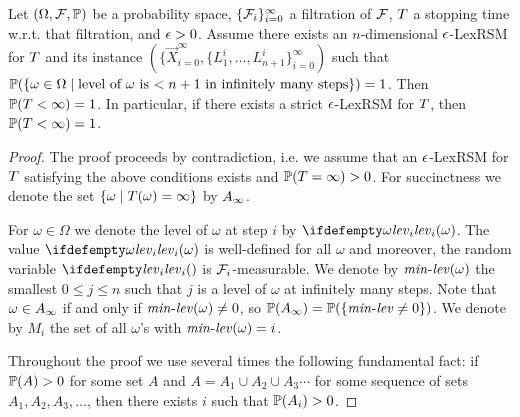 \begin{theorem}
\label{thm:lexrsm-main}
\label{THM:LEXRSM-MAIN}
Let $(\Omega,\mathcal{F},\mathbb{P})$ be a probability space, 
$\{\mathcal{F}_i\}_{i=0}^{\infty}$ a filtration of $\mathcal{F}$, $T$ a 
stopping 
time w.r.t. that filtration, and $\epsilon>0$. Assume there exists an $n$-dimensional $\epsilon$-LexRSM for $T$ and its instance $(\{\vec{X}_{i=0}^{\infty},\{L_1^i,\dots,L_{n+1}^i\}_{i=0}^{\infty})$ such that $\mathbb{P}(\{\omega\in \Omega \mid \text{level of $\omega$ is $<n+1$ in infinitely many steps}\})=1$. Then $\mathbb{P}(T<\infty)=1$. In particular, if there exists a strict $\epsilon$-LexRSM for $T$, then $\mathbb{P}(T<\infty)=1$.
\end{theorem}
\begin{proof}
The proof proceeds by contradiction, i.e. we assume that an $\epsilon$-LexRSM for 
$T$ satisfying the above conditions exists and $\mathbb{P}(T=\infty)>0$. For succinctness we denote the 
set $\{\omega\mid T(\omega)=\infty\}$ by $A_{\infty}$.

For $\omega\in \Omega$ we denote the level of $\omega$ at step $i$ by $\levelrank{\omega}{i}$.
The value $\levelrank{\omega}{i}$ is well-defined for all 
$\omega$ and moreover, the random variable $\levelrank{}{i}$ is $\mathcal{F}_i$-measurable. We denote by $\mathit{min}\text{-}\mathit{lev}(\omega)$ the smallest $0 \leq j \leq n$ such 
that $j$ is a level of $\omega$ at infinitely many steps. Note that $\omega \in 
A_{\infty}$ if and only if $\mathit{min}\text{-}\mathit{lev}(\omega)\neq 0$, so $\mathbb{P}(A_{\infty})=\mathbb{P}(\{\mathit{min}\text{-}\mathit{lev} \neq 0 \})$. We denote by $M_i$ 
the set of all $\omega$'s with $\mathit{min}\text{-}\mathit{lev}(\omega)=i$.

Throughout the proof we use several times the following fundamental fact: if 
$\mathbb{P}(A)>0$ for some set $A$ and $A=A_1\cup A_2 \cup A_3\cdots$ for some 
sequence of sets $A_1,A_2,A_3,\dots$, then there exists $i$ such that 
$\mathbb{P}(A_i)>0$.


\end{proof}
